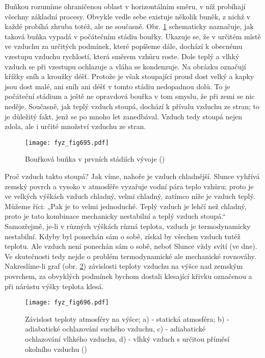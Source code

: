     Buňkou rozumíme ohraničenou oblast v horizontálním směru, v níž probíhají všechny základní
    procesy. Obvykle vedle sebe existuje několik buněk, z nichž v každé probíhá zhruba totéž, ale ne
    současně. Obr. \ref{fyz:fig695} schematicky naznačuje, jak taková buňka vypadá v počátečním
    stádiu bouřky. Ukazuje se, že v určitém místě ve vzduchu za určitých podmínek, které popíšeme
    dále, dochází k obecnému vzestupu vzduchu rychlostí, která směrem vzhůru roste. Dole teplý a
    vlhký vzduch se při vzestupu ochlazuje a vláha se kondenzuje. Na obrázku označují křížky sníh a
    kroužky déšť. Protože je však stoupající proud dost velký a kapky jsou dost malé, ani sníh ani
    déšť v tomto stádiu nedopadnou dolů. To je počáteční stádium a ještě ne opravdová bouřka v tom
    smyslu, že při zemi se nic neděje. Současně, jak teplý vzduch stoupá, dochází k přívalu vzduchu
    ze stran; to je důležitý fakt, jenž se po mnoho let zanedbával. Vzduch tedy stoupá nejen zdola,
    ale i určité množství vzduchu ze stran.    

    \begin{figure}[ht!] %
      \centering
      \texttt{[image: fyz\_fig695.pdf]}
      \caption{Bouřková buňka v prvních stádiích vývoje
               (\cite[s.~707]{Feynman02})}
      \label{fyz:fig695}
    \end{figure}

    Proč vzduch takto stoupá? Jak víme, nahoře je vzduch chladnější. Slunce vyhřívá zemský povrch a
    vysoko v atmosféře vyzařuje vodní pára teplo vzhůru; proto je ve velkých výškách vzduch chladný,
    velmi chladný, zatímco níže je vzduch teplý. Můžeme říci: „Pak je to velmi jednoduché. Teplý
    vzduch je lehčí než chladný, proto je tato kombinace mechanicky nestabilní a teplý vzduch
    stoupá.“ Samozřejmě, je-li v různých výškách různá teplota, vzduch je termodynamicky nestabilní.
    Kdyby byl ponechán sám o sobě, získal by všechen vzduch tutéž teplotu. Ale vzduch není ponechán
    sám o sobě, neboť Slunce vždy svítí (ve dne). Ve skutečnosti tedy nejde o problém termodynamické
    ale mechanické rovnováhy. Nakreslíme-li graf (obr. \ref{fyz:fig696}) závislosti teploty vzduchu
    na výšce nad zemským povrchem, za obvyklých podmínek bychom dostali klesající křivku označenou a
    při nárůstu výšky teplota klesá.

    \begin{figure}[ht!] %
      \centering
      \texttt{[image: fyz\_fig696.pdf]}
      \caption{Závislost teploty atmosféry na výšce; a) - statická atmosféra; b) - adiabatické
              ochlazování suchého vzduchu, c) - adiabatické ochlazování vlhkého vzduchu, d) - vlhký
              vzduch s určitou příměsí okolního vzduchu (\cite[s.~707]{Feynman02})}
      \label{fyz:fig696}
    \end{figure}

